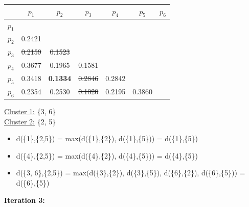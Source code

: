 \documentclass[11pt]{article}
\begin{document}
	\begin{center}
    	\begin{adjustbox}{max width=\textwidth}
		\begin{tabular}{ | c | c | c | c | c | c | c |}
	  	 	\hline

	  	 	& \textbf{$p_1$} & \textbf{$p_2$} & \textbf{$p_3$} & \textbf{$p_4$} & \textbf{$p_5$} & \textbf{$p_6$}\\
	  	 	\hline
	  	 	
	  	 	\textbf{$p_1$} &  &  &  &  &  &\\
	  	 	\hline
	  	 	
	  	 	\textbf{$p_2$} & 0.2421 &  &  &  &  &  \\
	  	 	\hline
	  	 	
	  	 	\textbf{$p_3$} & \st{0.2159} & \st{0.1523} &  &  &  & \\
	  	 	\hline
	  	 	
	  	 	\textbf{$p_4$} & 0.3677 & 0.1965 & \st{0.1581} &  &  & \\
	  	 	\hline
	  	 	
	  	 	\textbf{$p_5$} & 0.3418 & \textbf{0.1334} & \st{0.2846} & 0.2842 &  & \\
	  	 	\hline	
	  	 	
	  	 	\textbf{$p_6$} & 0.2354 & 0.2530 & \st{0.1020} & 0.2195 & 0.3860 & \\
	  	 	\hline			
    		\end{tabular}
    	\end{adjustbox}
	\end{center}
	
	\underline{Cluster 1:} \{3, 6\} \\
	\underline{Cluster 2:} \{2, 5\}
	
	\begin{itemize}
		\item d(\{1\},\{2,5\}) = max(d(\{1\},\{2\}), d(\{1\},\{5\})) = d(\{1\},\{5\})
		\item d(\{4\},\{2,5\}) = max(d(\{4\},\{2\}), d(\{4\},\{5\})) = d(\{4\},\{5\})
		\item d(\{3, 6\},\{2,5\}) = max(d(\{3\},\{2\}), d(\{3\},\{5\}), d(\{6\},\{2\}), d(\{6\},\{5\})) = d(\{6\},\{5\})
	\end{itemize}
	
	\vspace{5mm}
	
	\textbf{Iteration 3:}
	
\end{document}
